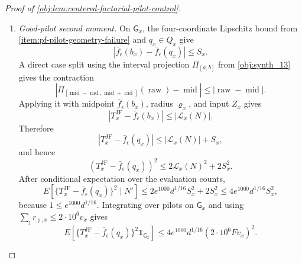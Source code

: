 \begin{proof}[Proof of \cref{obj:lem:centered-factorial-pilot-control}]
\begin{enumerate}
\[+\operatorname{rad}(\operatorname{raw}-\operatorname{mid})
+\operatorname{rad}^2\ge0,
\]
and the case \(\operatorname{raw}>\operatorname{mid}+\operatorname{rad}\) is identical with the middle sign reversed.  Applying this with midpoint \(\bar f_\epsilon(b_x)\), radius \(\varrho_x\), and input \(Z_x\), and using
\(Z_x-\bar f_\epsilon(b_x)=\mathcal L_x(N)\), gives
\[
|T_x^{\mathrm{JF}}-Z_x|
\le
\frac{\mathcal L_x(N)^2}{\varrho_x}.
\]
Using the factorial \(L_2\) bound from \cref{item:pf-good-pilot-factorial-ltwo},
\[
|E(T_x^{\mathrm{JF}}-Z_x\mid N')|
\le
\frac{e^{1000}d^{1/16}S_x^2}{d^{1/4}S_x}
=
e^{1000}F d^{-3/16}\sum_{\jmath\in\mathcal J}r_{\jmath,x}.
\]
Together with the good-pilot radius bound and \(L^2d^{-3/16}\le225\), this implies
\[
\left|
E(T_x^{\mathrm{JF}}\mid N')-\bar f_\epsilon(q_x)
\right|
\le
\{5\cdot10^{16}C_J+450000000\,e^{1000}F\}\eta_x
\qquad\text{on }\mathsf G_x .
\]

\item \emph{Good-pilot second moment.}
On \(\mathsf G_x\), the four-coordinate Lipschitz bound from \cref{item:pf-pilot-geometry-failure} and
\(q_x\in Q_x\) give
\[
|\bar f_\epsilon(b_x)-\bar f_\epsilon(q_x)|\le S_x .
\]
A direct case split using the interval projection \(\Pi_{[a,b]}\) from \cref{obj:synth_13} gives the contraction
\[
\left|
\Pi_{[\operatorname{mid}-\operatorname{rad},\operatorname{mid}+\operatorname{rad}]}
(\operatorname{raw})-\operatorname{mid}
\right|
\le
|\operatorname{raw}-\operatorname{mid}|.
\]
Applying it with midpoint \(\bar f_\epsilon(b_x)\), radius \(\varrho_x\), and input \(Z_x\) gives
\[
|T_x^{\mathrm{JF}}-\bar f_\epsilon(b_x)|
\le |\mathcal L_x(N)|.
\]
Therefore
\[
|T_x^{\mathrm{JF}}-\bar f_\epsilon(q_x)|
\le |\mathcal L_x(N)|+S_x,
\]
and hence
\[
(T_x^{\mathrm{JF}}-\bar f_\epsilon(q_x))^2
\le
2\mathcal L_x(N)^2+2S_x^2.
\]
After conditional expectation over the evaluation counts,
\[
E\!\left[
\{T_x^{\mathrm{JF}}-\bar f_\epsilon(q_x)\}^2
\mid N'
\right]
\le
2e^{1000}d^{1/16}S_x^2+2S_x^2
\le
4e^{1000}d^{1/16}S_x^2,
\]
because \(1\le e^{1000}d^{1/16}\).  Integrating over pilots on \(\mathsf G_x\) and using
\(\sum_{\jmath}r_{\jmath,x}\le2\cdot10^6v_x\) gives
\[
E\!\left[
\{T_x^{\mathrm{JF}}-\bar f_\epsilon(q_x)\}^2\mathbf 1_{\mathsf G_x}
\right]
\le
4e^{1000}d^{1/16}(2\cdot10^6Fv_x)^2 .
\]


\end{enumerate}
\end{proof}
